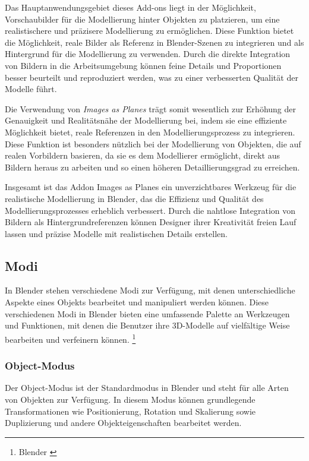 Das Hauptanwendungsgebiet dieses Add-ons liegt in der Möglichkeit, Vorschaubilder für die Modellierung hinter Objekten
zu platzieren, um eine realistischere und präzisere Modellierung zu ermöglichen. Diese Funktion bietet die Möglichkeit,
reale Bilder als Referenz in Blender-Szenen zu integrieren und als Hintergrund für die Modellierung zu verwenden. Durch
die direkte Integration von Bildern in die Arbeitsumgebung können feine Details und Proportionen besser beurteilt und
reproduziert werden, was zu einer verbesserten Qualität der Modelle führt.

Die Verwendung von \textit{Images as Planes} trägt somit wesentlich zur Erhöhung der Genauigkeit und Realitätsnähe der
Modellierung bei, indem sie eine effiziente Möglichkeit bietet, reale Referenzen in den Modellierungsprozess zu integrieren.
Diese Funktion ist besonders nützlich bei der Modellierung von Objekten, die auf realen Vorbildern basieren, da sie es
dem Modellierer ermöglicht, direkt aus Bildern heraus zu arbeiten und so einen höheren Detaillierungsgrad zu erreichen.

Insgesamt ist das Addon Images as Planes ein unverzichtbares Werkzeug für die realistische Modellierung in Blender,
das die Effizienz und Qualität des Modellierungsprozesses erheblich verbessert. Durch die nahtlose Integration von Bildern
als Hintergrundreferenzen können Designer ihrer Kreativität freien Lauf lassen und präzise Modelle mit realistischen
Details erstellen.

\subsection{Modi}
In Blender stehen verschiedene Modi zur Verfügung, mit denen unterschiedliche Aspekte eines Objekts bearbeitet und
manipuliert werden können. Diese verschiedenen Modi in Blender bieten eine umfassende Palette an Werkzeugen und Funktionen,
mit denen die Benutzer ihre 3D-Modelle auf vielfältige Weise bearbeiten und verfeinern können. \footnote{Blender \cite{Modi}}

\subsubsection{Object-Modus}
Der Object-Modus ist der Standardmodus in Blender und steht für alle Arten von Objekten zur Verfügung. In diesem Modus
können grundlegende Transformationen wie Positionierung, Rotation und Skalierung sowie Duplizierung und andere
Objekteigenschaften bearbeitet werden.

